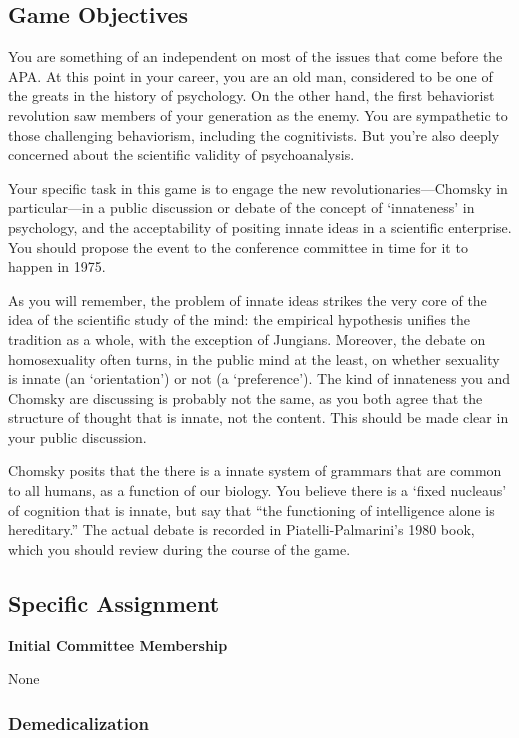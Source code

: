 \begin{refsection}
\section{Game Objectives}
\label{gameobjectives}

You are something of an independent on most of the issues that come before the APA. At this point in your career, you are an old man, considered to be one of the greats in the history of psychology. On the other hand, the first behaviorist revolution saw members of your generation as the enemy. You are sympathetic to those challenging behaviorism, including the cognitivists. But you're also deeply concerned about the scientific validity of psychoanalysis.

Your specific task in this game is to engage the new revolutionaries—Chomsky in particular—in a public discussion or debate of the concept of `innateness' in psychology, and the acceptability of positing innate ideas in a scientific enterprise. You should propose the event to the conference committee in time for it to happen in 1975.

As you will remember, the problem of innate ideas strikes the very core of the idea of the scientific study of the mind: the empirical hypothesis unifies the tradition as a whole, with the exception of Jungians. Moreover, the debate on homosexuality often turns, in the public mind at the least, on whether sexuality is innate (an `orientation') or not (a `preference'). The kind of innateness you and Chomsky are discussing is probably not the same, as you both agree that the structure of thought that is innate, not the content. This should be made clear in your public discussion.

Chomsky posits that the there is a innate system of grammars that are common to all humans, as a function of our biology. You believe there is a `fixed nucleaus' of cognition that is innate, but say that “the functioning of intelligence alone is hereditary.” The actual debate is recorded in Piatelli-Palmarini's 1980 book, which you should review during the course of the game.

\subsection{Specific Assignment}
\label{specificassignment}

\textbf{Initial Committee Membership}

None

\subsubsection{Demedicalization}
\label{demedicalization}


\end{refsection}
